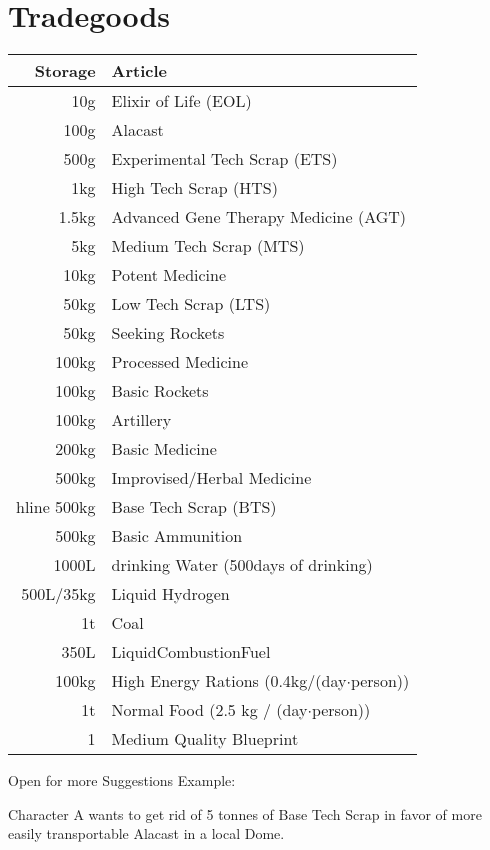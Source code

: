\section{Tradegoods}\label{sec:tradegoods}
\begin{tabular}{|r|l|}
    \hline
    Storage & Article\\\hline
    10g & Elixir of Life (EOL)\\\hline
    100g & Alacast\\\hline
    500g & Experimental Tech Scrap (ETS)\\\hline
    1kg & High Tech Scrap (HTS)\\\hline
    1.5kg & Advanced Gene Therapy Medicine (AGT)\\\hline
    5kg & Medium Tech Scrap (MTS)\\\hline
    10kg & Potent Medicine\\\hline
    50kg & Low Tech Scrap (LTS)\\\hline
    50kg & Seeking Rockets\\\hline
    100kg & Processed Medicine\\\hline
    100kg & Basic Rockets\\\hline
    100kg & Artillery\\\hline
    200kg & Basic Medicine\\\hline
    500kg & Improvised/Herbal Medicine\\hline
    500kg & Base Tech Scrap (BTS)\\\hline
    500kg & Basic Ammunition\\\hline
    1000L & drinking Water (500days of drinking)\\\hline
    500L/35kg & Liquid Hydrogen\\\hline
    1t & Coal\\\hline
    350L & LiquidCombustionFuel\\\hline
    100kg & High Energy Rations (0.4kg/(day\(\cdot\)person))\\\hline
    1t & Normal Food (2.5 kg / (day\(\cdot\)person))\\\hline
    1 & Medium Quality Blueprint\\\hline
\end{tabular}\par
Open for more Suggestions\vspace{1.5cm}
Example:\par
Character A wants to get rid of 5 tonnes of Base Tech Scrap in favor of more easily transportable Alacast in a local
Dome.\par
